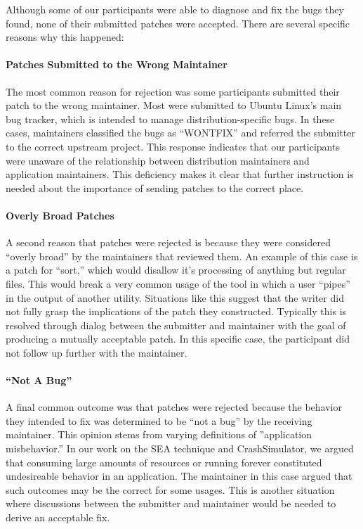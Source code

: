 Although some of our participants were able to diagnose and fix the bugs they found,
none of their submitted patches were accepted.
There are several specific reasons why this happened:

\paragraph{Patches Submitted to the Wrong Maintainer}
The most common reason for rejection was some participants submitted their patch to the wrong maintainer.
Most were submitted to Ubuntu Linux's main bug tracker, which is intended to manage distribution-specific bugs.
In these cases,
maintainers classified the bugs as ``WONTFIX'' and referred the submitter to the correct upstream project.
This response indicates that our participants were unaware of the relationship between distribution maintainers and application maintainers.
This deficiency makes it clear that  further instruction is needed about the importance of sending patches to the correct place.

\paragraph{Overly Broad Patches}
A second reason that patches were rejected is because they were considered ``overly broad'' by the maintainers that reviewed them.
An example of this case is a patch for ``sort,'' which would disallow it's processing of anything but regular files.
This would break a very common usage of the tool in which a user ``pipes'' in the output of another utility.
Situations like this suggest that the writer did not fully grasp the implications of the patch they constructed.
Typically this is resolved through dialog between the submitter and maintainer with the goal of producing a mutually acceptable patch.
In this specific case, the participant did not follow up further with the maintainer.

\paragraph{``Not A Bug''}
A final common outcome was that patches were rejected because the behavior they intended to fix was determined to be ``not a bug'' by the receiving maintainer.
This opinion stems from varying definitions of ''application misbehavior.''
In our work on the SEA technique and CrashSimulator, we argued that  consuming large amounts of resources or running forever constituted undesireable behavior in an application.
The maintainer in this case argued that such outcomes may be the correct
for some usages.
This is another situation where discussions between the submitter and maintainer would be needed to derive an acceptable fix.

